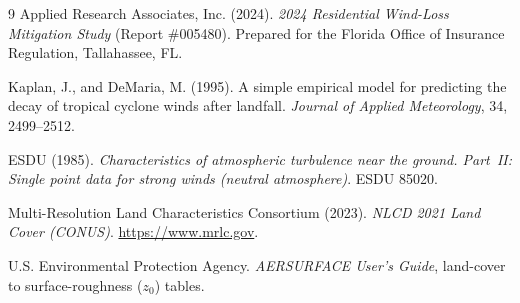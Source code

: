 \documentclass[11pt]{article}
\begin{document}
\begin{thebibliography}{9}
 Applied Research Associates, Inc. (2024). \emph{2024
Residential Wind-Loss Mitigation Study} (Report \#005480). Prepared for the
Florida Office of Insurance Regulation, Tallahassee, FL.

 Kaplan, J., and DeMaria, M. (1995). A simple empirical model for
predicting the decay of tropical cyclone winds after landfall.
\emph{Journal of Applied Meteorology}, 34, 2499--2512.

 ESDU (1985). \emph{Characteristics of atmospheric turbulence near the
ground. Part~II: Single point data for strong winds (neutral atmosphere)}. ESDU 85020.

 Multi-Resolution Land Characteristics Consortium (2023).
\emph{NLCD 2021 Land Cover (CONUS)}. \url{https://www.mrlc.gov}.

 U.S. Environmental Protection Agency.
\emph{AERSURFACE User's Guide}, land-cover to surface-roughness ($z_0$) tables.
\end{thebibliography}
\end{document}
